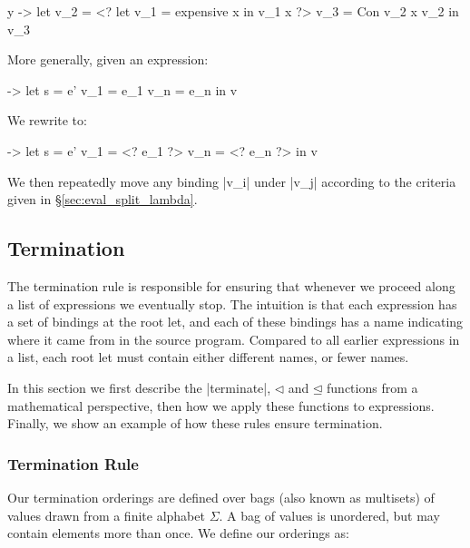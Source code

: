 \documentclass[draft]{sigplanconf}
\begin{document}
\begin{code}
\x y ->  let  v_2 = <? let v_1 = expensive x in v_1 x ?>
              v_3 = Con v_2 x v_2
         in   v_3
\end{code}

More generally, given an expression:

\begin{code}
\free ->  let  s    = e'
               v_1  = e_1
               v_n  = e_n
          in   v
\end{code}

\noindent We rewrite to:

\begin{code}
\free ->  let  s    = e'
               v_1  = <? e_1 ?>
               v_n  = <? e_n ?>
          in   v
\end{code}

We then repeatedly move any binding |v_i| under |v_j| according to the criteria given in \S\ref{sec:eval_split_lambda}.

\subsection{Termination}
\label{sec:term}

The termination rule is responsible for ensuring that whenever we proceed along a list of expressions we eventually stop. The intuition is that each expression has a set of bindings at the root let, and each of these bindings has a name indicating where it came from in the source program. Compared to all earlier expressions in a list, each root let must contain either different names, or fewer names.

In this section we first describe the |terminate|, $\lhd$ and $\unlhd$ functions from a mathematical perspective, then how we apply these functions to expressions. Finally, we show an example of how these rules ensure termination.

\subsubsection{Termination Rule}
\label{sec:term_rule}

Our termination orderings are defined over bags (also known as multisets) of values drawn from a finite alphabet $\Sigma$. A bag of values is unordered, but may contain elements more than once. We define our orderings as:

\vspace{-\bigskipamount}
\end{document}
